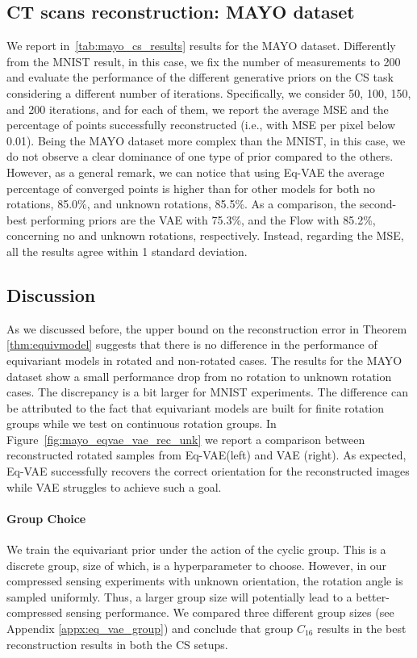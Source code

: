 \subsection{CT scans reconstruction: MAYO dataset}
We report in~\autoref{tab:mayo_cs_results} results for the MAYO dataset. Differently from the MNIST result, in this case, we fix the number of measurements to 200 and evaluate the performance of the different generative priors on the CS task considering a different number of iterations. Specifically, we consider 50, 100, 150, and 200 iterations, and for each of them, we report the average MSE and the percentage of points successfully reconstructed (i.e., with MSE per pixel below 0.01). 
Being the MAYO dataset more complex than the MNIST, in this case, we do not observe a clear dominance of one type of prior compared to the others. However, as a general remark, we can notice that using Eq-VAE the average percentage of converged points is higher than for other models for both no rotations, 85.0\%, and unknown rotations, 85.5\%. As a comparison, the second-best performing priors are the VAE with 75.3\%, and the Flow with 85.2\%, concerning no and unknown rotations, respectively. 
Instead, regarding the MSE, all the results agree within 1 standard deviation.



\subsection{Discussion}
As we discussed before, the upper bound on the reconstruction error in Theorem \ref{thm:equivmodel} suggests that there is no difference in the performance of equivariant models in rotated and non-rotated cases. The results for the MAYO dataset show a small performance drop from no rotation to unknown rotation cases. The discrepancy is a bit larger for MNIST experiments. 
The difference can be attributed to the fact that equivariant models are built for finite rotation groups while we test on continuous rotation groups. 
In Figure~\ref{fig:mayo_eqvae_vae_rec_unk} we report a comparison between reconstructed rotated samples from Eq-VAE(left) and VAE (right). As expected, Eq-VAE successfully recovers the correct orientation for the reconstructed images while VAE struggles to achieve such a goal. 

\paragraph{Group Choice} 
We train the equivariant prior under the action of the cyclic group. This is a discrete group, size of which, is a hyperparameter to choose. However, in our compressed sensing experiments with unknown orientation, the rotation angle is sampled uniformly. Thus, a larger group size will potentially lead to a better-compressed sensing performance. We compared three different group sizes (see Appendix \ref{appx:eq_vae_group}) and conclude that group $C_{16}$ results in the best reconstruction results in both the CS setups.
